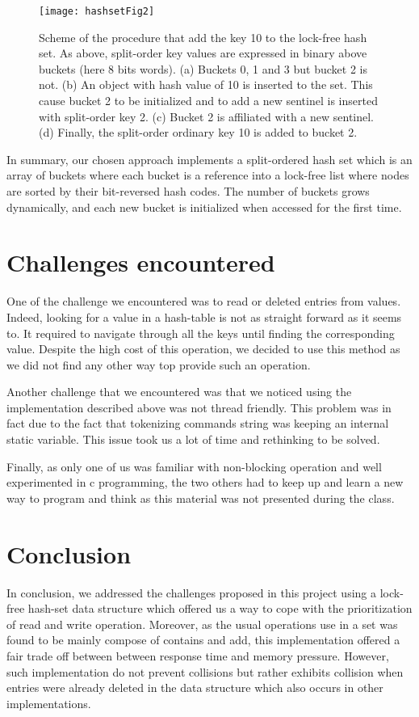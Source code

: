 \documentclass[a4paper,11pt]{report}
\begin{document}
    \begin{figure}[h]
        \centering
            \texttt{[image: hashsetFig2]}
        \caption{Scheme of the procedure that add the key 10 to the lock-free hash set.
        As above, split-order key values are expressed in binary above buckets (here 8 bits words).
        (a) Buckets 0, 1 and 3 but bucket 2 is not.
        (b) An object with hash value of 10 is inserted to the set. This cause bucket 2 to be initialized and to
        add a new sentinel is inserted with split-order key 2.
        (c) Bucket 2 is affiliated with a new sentinel.
        (d) Finally, the split-order ordinary key 10 is added to bucket 2.}
        \label{fig:Fig2}
    \end{figure}

    In summary, our chosen approach implements a split-ordered hash set which is an array of buckets where each bucket
    is a reference into a lock-free list where nodes are sorted by their bit-reversed hash codes.
    The number of buckets grows dynamically, and each new bucket is initialized when accessed for the first time.

    \section*{Challenges encountered}
    One of the challenge we encountered was to read or deleted entries from values.
    Indeed, looking for a value in a hash-table is not as straight forward as it seems to.
    It required to navigate through all the keys until finding the corresponding value.
    Despite the high cost of this operation, we decided to use this method as we did not find any other way top provide
    such an operation.

    Another challenge that we encountered was that we noticed using the implementation described above was not
    thread friendly.
    This problem was in fact due to the fact that tokenizing commands string was keeping an internal static variable.
    This issue took us a lot of time and rethinking to be solved.

    Finally, as only one of us was familiar with non-blocking operation and well experimented in c programming,
    the two others had to keep up and learn a new way to program and think as this material was not presented
    during the class.

    \section*{Conclusion}
    In conclusion, we addressed the challenges proposed in this project using a lock-free hash-set data structure which
    offered us a way to cope with the prioritization of read and write operation. Moreover, as the usual operations use
    in a set was found to be mainly compose of contains and add, this implementation offered a fair trade off between
    between response time and memory pressure. However, such implementation do not prevent collisions but rather
    exhibits collision when entries were already deleted in the data structure which also occurs in other implementations.
\end{document}
